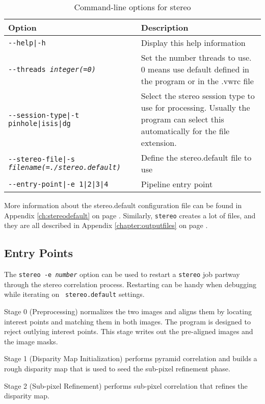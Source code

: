 \begin{longtable}{|l|p{7.5cm}|}
\caption{Command-line options for stereo}
\label{tbl:stereo}
\endfirsthead
\endhead
\endfoot
\endlastfoot
\hline
Option & Description \\ \hline \hline
\texttt{-\/-help|-h} & Display this help information\\ \hline
\texttt{-\/-threads \textit{integer(=0)}} & Set the number threads to use. 0 means use default defined in the program or in the .vwrc file\\ \hline
\texttt{-\/-session-type|-t pinhole|isis|dg} & Select the stereo session type to use for processing. Usually the program can select this automatically for the file extension.\\ \hline
\texttt{-\/-stereo-file|-s \textit{filename(=./stereo.default)}} & Define the stereo.default file to use\\ \hline
\texttt{-\/-entry-point|-e 1|2|3|4} & Pipeline entry point \\ \hline
\end{longtable}

More information about the stereo.default configuration file can be
found in Appendix \ref{ch:stereodefault} on page
\pageref{ch:stereodefault}.  Similarly, \texttt{stereo} creates a lot
of files, and they are all described in Appendix
\ref{chapter:outputfiles} on page \pageref{chapter:outputfiles}.

\subsection{Entry Points}
\label{entrypoints}

The \texttt{stereo -e \textit{number}} option can be used to restart
a {\tt stereo} job partway through the stereo correlation process.
Restarting can be handy when debugging while iterating on {\tt
stereo.default} settings.

Stage 0 (Preprocessing) normalizes the two images and aligns them
by locating interest points and matching them in both images. The
program is designed to reject outlying interest points.  This stage
writes out the pre-aligned images and the image masks.

Stage 1 (Disparity Map Initialization) performs pyramid correlation and builds a rough disparity map that is used to seed the sub-pixel refinement phase.

Stage 2 (Sub-pixel Refinement) performs sub-pixel correlation that
refines the disparity map.

